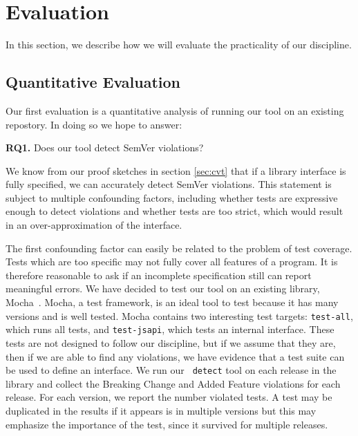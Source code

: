 \section{Evaluation}

In this section, we describe how we will evaluate the practicality of
our discipline.

\subsection{Quantitative Evaluation}

Our first evaluation is a quantitative analysis of running our tool on
an existing repostory. In doing so we hope to answer:

{\bf RQ1.} Does our tool detect SemVer violations?

We know from our proof sketches in section \ref{sec:cvt} that if a
library interface is fully specified, we can accurately detect SemVer
violations. This statement is subject to multiple confounding
factors, including whether tests are expressive enough to detect
violations and whether tests are too strict, which would result in an
over-approximation of the interface.

The first confounding factor can easily be related to the problem of
test coverage. Tests which are too specific may not fully cover all
features of a program. It is therefore reasonable to ask if an
incomplete specification still can report meaningful errors. We have
decided to test our tool on an existing library,
Mocha~\cite{mocha}. Mocha, a test framework, is an ideal tool to test
because it has many versions and is well tested. Mocha contains two
interesting test targets: {\tt test-all}, which runs all tests, and
{\tt test-jsapi}, which tests an internal interface. These tests are
not designed to follow our discipline, but if we assume that they
are, then if we are able to find any violations, we have evidence
that a test suite can be used to define an interface. We run our {\tt
  detect} tool on each release in the library and collect the
Breaking Change and Added Feature violations for each release. For
each version, we report the number violated tests. A test may be
duplicated in the results if it appears is in multiple versions but
this may emphasize the importance of the test, since it survived for
multiple releases.

